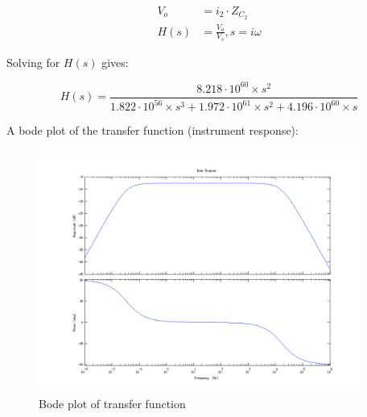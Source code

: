 \documentclass[a4paper]{article}
\begin{document}
\begin{align}
  \label{eqn:vo}
  V_o &= i_2 \cdot Z_{C_2} \\
  H(s) &= \frac{V_o}{V_s}, s = i\omega
\end{align}

Solving for $H(s)$ gives:

\begin{equation}
  H(s) = \frac{8.218 \cdot 10^{60} \times s^2}
  {1.822 \cdot 10^{56} \times s^3 + 
   1.972 \cdot 10^{61} \times s^2 +
   4.196 \cdot 10^{60} \times s}
  \label{eqn:transferfunction}
\end{equation}

\newpage
A bode plot of the transfer function (instrument response):
\begin{figure}[h]
  \begin{center}
    \includegraphics[width=400px]{bodeplot.png}
  \end{center}
  \caption{Bode plot of transfer function}
  \label{fig:bodeplot}
\end{figure}
\end{document}
